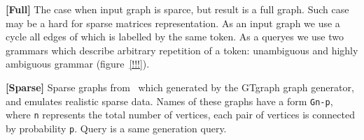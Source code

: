 \textbf{[Full]} The case when input graph is sparce, but result is a full graph. 
Such case may be a hard for sparse matrices representation.
As an input graph we use a cycle all edges of which is labelled by the same token.
As a queryes we use two grammars which describe arbitrary repetition of a token: unambiguous and highly ambiguous grammar (figure~\ref{!!!}). 

\textbf{[Sparse]} Sparse graphs from~\cite{fan2018scaling} which generated by the GTgraph graph generator, and emulates realistic sparse data. 
Names of these graphs have a form \texttt{Gn-p}, where \texttt{n} represents the total number of vertices, each pair of vertices is connected by probability \texttt{p}. 
Query is a same generation query.

